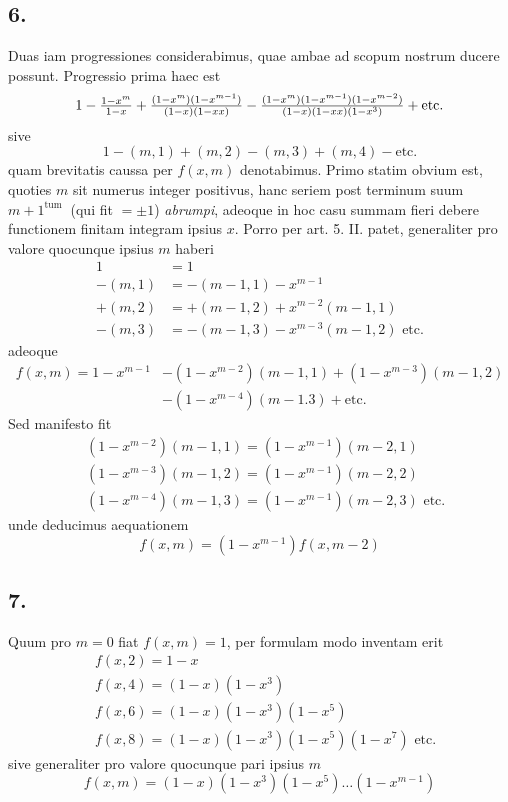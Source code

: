 \documentclass[twoside,12pt]{memoir}
\let\oldfrac\frac
\def\frac#1#2{\mathchoice{\tfrac{#1}{#2}}{\oldfrac{#1}{#2}}{\genfrac{}{}{}{2}{#1}{#2\mathstrut}}{\genfrac{}{}{}{3}{#1}{#2\mathstrut}}}
\begin{document}
\subsection*{6.}
 
Duas iam progressiones considerabimus, quae ambae ad scopum nostrum ducere possunt. Progressio prima haec est\pagebreak%
\[1-\frac{1-x^{m}}{1-x}+\frac{(1-x^{m})(1-x^{m-1})}{(1-x)(1-x x)}-\frac{(1-x^{m})(1-x^{m-1})(1-x^{m-2})}{(1-x)(1-x x)(1-x^{3})}+\text{etc.}\]
sive
\[1-(m, 1)+(m, 2)-(m, 3)+(m, 4)-\text{etc.}\]
quam brevitatis caussa per \(f(x, m)\) denotabimus. Primo statim obvium est, quoties \(m\) sit numerus integer positivus, hanc seriem post terminum suum \({m+1}^{\text{tum }}\) (qui fit \(= \pm 1\)) \textit{abrumpi}, adeoque in hoc casu summam fieri debere functionem finitam integram ipsius \(x\). Porro per art. 5. II. patet, generaliter pro valore quocunque ipsius \(m\) haberi
\[\begin{aligned}
1 & =1 \\
-(m, 1) & =-(m-1,1)-x^{m-1} \\
+(m, 2) & =+(m-1,2)+x^{m-2}(m-1,1) \\
-(m, 3) & =-(m-1,3)-x^{m-3}(m-1,2) \text{ etc.}
\end{aligned}\]
adeoque
\[\begin{aligned}
f(x, m)=1-x^{m-1}&-(1-x^{m-2})(m-1,1)+(1-x^{m-3})(m-1,2) \\
&-(1-x^{m-4})(m-1.3)+\text{etc.}
\end{aligned}\]
Sed manifesto fit
\[\begin{aligned}
& (1-x^{m-2})(m-1,1)=(1-x^{m-1})(m-2,1) \\
& (1-x^{m-3})(m-1,2)=(1-x^{m-1})(m-2,2) \\
& (1-x^{m-4})(m-1,3)=(1-x^{m-1})(m-2,3) \text{ etc.}
\end{aligned}\]
unde deducimus aequationem
\[f(x, m)=(1-x^{m-1}) f(x, m-2) \tag{1}\]

\subsection*{7.}
 
Quum pro \(m=0\) fiat \(f(x, m)=1\), per formulam modo inventam erit
\[\begin{aligned}
& f(x, 2)=1-x \\
& f(x, 4)=(1-x)(1-x^{3}) \\
& f(x, 6)=(1-x)(1-x^{3})(1-x^{5}) \\
& f(x, 8)=(1-x)(1-x^{3})(1-x^{5})(1-x^{7}) \text{ etc.}
\end{aligned}\]
sive generaliter pro valore quocunque pari ipsius \(m\)
\[f(x, m)=(1-x)(1-x^{3})(1-x^{5}) \ldots (1-x^{m-1}) \tag{2}\]\pagebreak%
\end{document}

